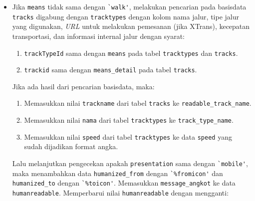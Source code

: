 \begin{itemize}
\begin{itemize}
		 \item Jika \verb!means! tidak sama dengan \verb!`walk'!, melakukan pencarian pada basisdata \verb!tracks! digabung dengan \verb!tracktypes! dengan kolom nama jalur, tipe jalur yang digunakan, \textit{URL} untuk melakukan pemesanan (jika XTrans), kecepatan transportasi, dan informasi internal jalur dengan syarat:
				\begin{enumerate}
					\item \verb!trackTypeId! sama dengan \verb!means! pada tabel \verb!tracktypes! dan \verb!tracks!.
					\item \verb!trackid! sama dengan \verb!means_detail! pada tabel \verb!tracks!.
				\end{enumerate}						 
		  Jika ada hasil dari pencarian basisdata, maka: 
		  \begin{enumerate}
		  		\item Memasukkan nilai \verb!trackname! dari tabel \verb!tracks! ke \verb!readable_track_name!.
		  		\item Memasukkan nilai \verb!nama! dari tabel \verb!tracktypes! ke \verb!track_type_name!.
		  		\item Memasukkan nilai \verb!speed! dari tabel \verb!tracktypes! ke data \verb!speed! yang sudah dijadikan format angka.
		  \end{enumerate}
		  Lalu melanjutkan pengecekan apakah \verb!presentation! sama dengan \verb!`mobile'!, maka menambahkan data \verb!humanized_from! dengan \verb!`%fromicon'! dan \verb!humanized_to! dengan \verb!`%toicon'!. Memasukkan \verb!message_angkot! ke data \verb!humanreadable!. Memperbarui nilai \verb!humanreadable! dengan mengganti:
		  

\end{itemize}
\end{itemize}
